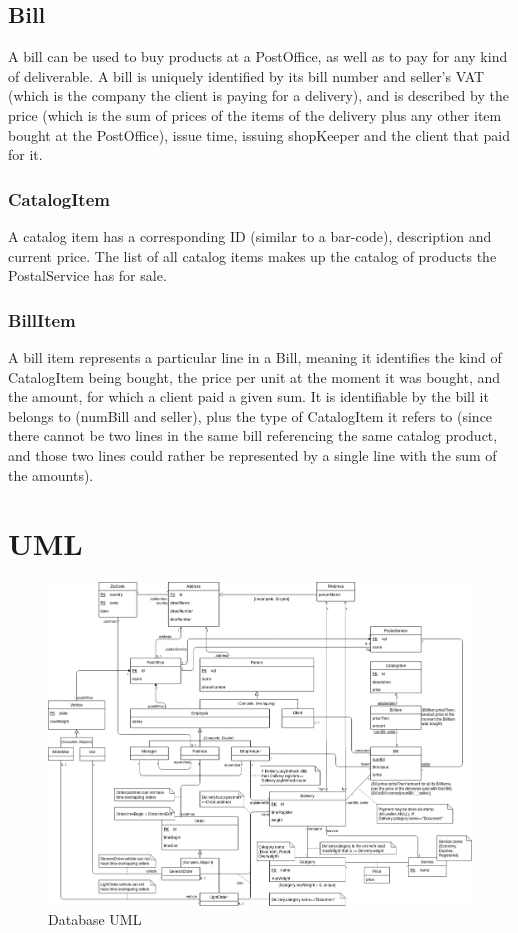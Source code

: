\documentclass{report}[a4paper]
\theoremstyle{remark}
\begin{document}
\subsection{Bill}
A bill can be used to buy products at a PostOffice, as well as to pay for any kind of deliverable. A bill is uniquely identified by its bill number and seller's VAT (which is the company the client is paying for a delivery), and is described by the price (which is the sum of prices of the items of the delivery plus any other item bought at the PostOffice), issue time, issuing shopKeeper and the client that paid for it.
\subsubsection{CatalogItem}
A catalog item has a corresponding ID (similar to a bar-code), description and current price. The list of all catalog items makes up the catalog of products the PostalService has for sale.
\subsubsection{BillItem}
A bill item represents a particular line in a Bill, meaning it identifies the kind of CatalogItem being bought, the price per unit at the moment it was bought, and the amount, for which a client paid a given sum. It is identifiable by the bill it belongs to (numBill and seller), plus the type of CatalogItem it refers to (since there cannot be two lines in the same bill referencing the same catalog product, and those two lines could rather be represented by a single line with the sum of the amounts).
\section{UML}
\begin{figure}[H] \centering
	\includegraphics[angle=-90,scale=0.377]{uml2}
	\caption{Database UML}
\end{figure}
\end{document}
